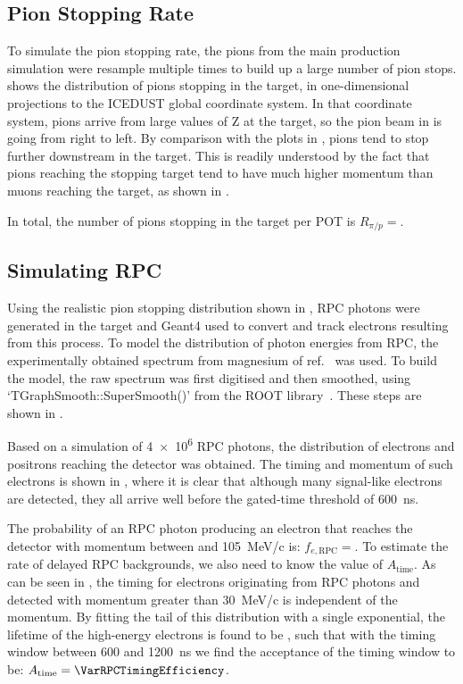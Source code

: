 \subsection{Pion Stopping Rate}
\FigPionStopDist
\FigPiVsMuMomenta
To simulate the pion stopping rate, the pions from the main production simulation were resample multiple times to build up a large number of pion stops.
 shows the distribution of pions stopping in the target, in one-dimensional projections to the ICEDUST global coordinate system.
In that coordinate system, pions arrive from large values of Z at the target, so the pion beam in  is going from right to left.
By comparison with the plots in , pions tend to stop further downstream in the target.
This is readily understood by the fact that pions reaching the stopping target tend to have much higher momentum than muons reaching the target, as shown in .

In total, the number of pions stopping in the target per \ac{POT} is $R_{\pi/p}=$\VarPiStopsPerPOT.

\subsection{Simulating \acs{RPC}}
\FigRPCSimulatedSpectrum
\FigRPCSimResults
Using the realistic pion stopping distribution shown in , \ac{RPC} photons were generated in the target and Geant4 used to convert and track electrons resulting from this process.
To model the distribution of photon energies from \ac{RPC}, the experimentally obtained spectrum from magnesium of ref.~\cite{Bistirlich:1972jy} was used.
To build the model, the raw spectrum was first digitised and then smoothed, using `TGraphSmooth::SuperSmooth()' from the  ROOT library~\cite{ROOT}.
These steps are shown in .

Based on a simulation of \num{4e6} RPC photons, the distribution of electrons and positrons reaching the detector was obtained.
The timing and momentum of such electrons is shown in , where it is clear that although many signal-like electrons are detected, they all arrive well before the gated-time threshold of 600~ns.

The probability of an \ac{RPC} photon producing an electron that reaches the detector with momentum between \VarMomThreshold and 105~MeV/c is: $f_{e,\textrm{RPC}}=$\VarDetectedEsPerRPC.
To estimate the rate of delayed \ac{RPC} backgrounds, we also need to know the value of $A_\textrm{time}$.
As can be seen in , the timing for electrons originating from RPC photons and detected with momentum greater than 30~MeV/c is independent of the momentum.
By fitting the tail of this distribution with a single exponential, the lifetime of the high-energy electrons is found to be \VarRPCLifetime, such that with the timing window between 600 and 1200~ns we find the acceptance of the timing window to be: $A_\textrm{time}=\VarRPCTimingEfficiency$.

